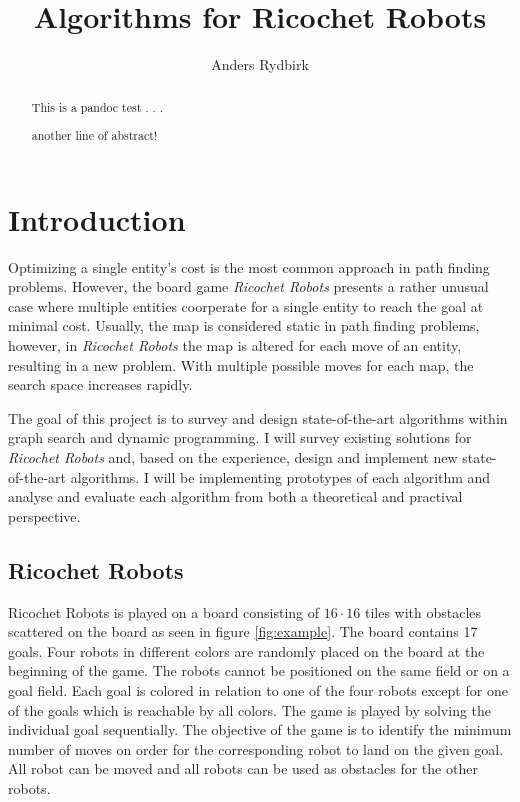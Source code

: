 \documentclass[]{article}
\title{Algorithms for Ricochet Robots}
\author{Anders Rydbirk}
\date{}
\begin{document}
\maketitle
\begin{abstract}
This is a pandoc test . . .

another line of abstract!
\end{abstract}

{
\hypersetup{linkcolor=black}
\setcounter{tocdepth}{3}
\tableofcontents
}
\newpage

\section{Introduction}\label{introduction}

Optimizing a single entity's cost is the most common approach in path
finding problems. However, the board game \emph{Ricochet Robots}
presents a rather unusual case where multiple entities coorperate for a
single entity to reach the goal at minimal cost. Usually, the map is
considered static in path finding problems, however, in \emph{Ricochet
Robots} the map is altered for each move of an entity, resulting in a
new problem. With multiple possible moves for each map, the search space
increases rapidly.

The goal of this project is to survey and design state-of-the-art
algorithms within graph search and dynamic programming. I will survey
existing solutions for \emph{Ricochet Robots} and, based on the
experience, design and implement new state-of-the-art algorithms. I will
be implementing prototypes of each algorithm and analyse and evaluate
each algorithm from both a theoretical and practival perspective.

\subsection{Ricochet Robots}\label{ricochet-robots}

Ricochet Robots is played on a board consisting of \(16 \cdot 16\) tiles
with obstacles scattered on the board as seen in figure
\ref{fig:example}. The board contains 17 goals. Four robots in different
colors are randomly placed on the board at the beginning of the game.
The robots cannot be positioned on the same field or on a goal field.
Each goal is colored in relation to one of the four robots except for
one of the goals which is reachable by all colors. The game is played by
solving the individual goal sequentially. The objective of the game is
to identify the minimum number of moves on order for the corresponding
robot to land on the given goal. All robot can be moved and all robots
can be used as obstacles for the other robots.
\end{document}
